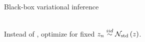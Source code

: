 \documentclass[8pt]{beamer}\usepackage[]{graphicx}\usepackage[]{color}
\begin{document}
\begin{frame}[t]{Black-box variational inference}
\pause
\hrulefill

\\Instead of ,
optimize  for fixed $z_n \overset{iid}{\sim} \mathcal{N}_{\mathrm{std}}\left(z\right)$.


%

\end{frame}



    






\end{document}
